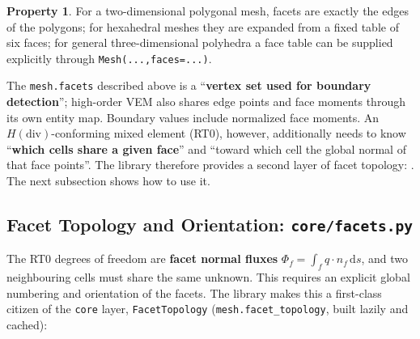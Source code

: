 \documentclass[11pt,oneside]{book}
\theoremstyle{definition}
\newtheorem{property}{Property}[chapter]
\theoremstyle{plain}
\newenvironment{caution}{%
  \begin{tcolorbox}[colback=orange!5,colframe=orange!55,title=Caution,fonttitle=\bfseries]%
}{%
  \end{tcolorbox}%
}
\newcommand{\code}[1]{\texttt{#1}}
\newcommand{\dif}{\,\mathrm{d}}
\begin{document}
\begin{property}
For a two-dimensional polygonal mesh, facets are exactly the edges of the polygons;
for hexahedral meshes they are expanded from a fixed table of six faces; for general
three-dimensional polyhedra a face table can be supplied explicitly through
\code{Mesh(...,\allowbreak  faces=...)}.
\end{property}

\begin{caution}
The \code{mesh.facets} described above is a ``\textbf{vertex set used for boundary
detection}''; high-order VEM also shares edge points and face moments through
its own entity map. Boundary values include normalized face moments. An $H(\mathrm{div})$-conforming mixed element (RT0),
however, additionally needs to know ``\textbf{which cells share a given face}'' and
``toward which cell the global normal of that face points''. The library therefore
provides a second layer of facet topology: . The next
subsection shows how to use it.
\end{caution}

\subsection{Facet Topology and Orientation: \code{core/facets.py}}
\label{sec:facets}

The RT0 degrees of freedom are \textbf{facet normal fluxes}
$\Phi_f=\int_f q\cdot n_f\dif s$, and two neighbouring cells must share the same
unknown. This requires an explicit global numbering and orientation of the facets.
The library makes this a first-class citizen of the \code{core} layer,
\code{FacetTopology} (\code{mesh.facet\_\allowbreak topology}, built lazily and cached):
\end{document}
